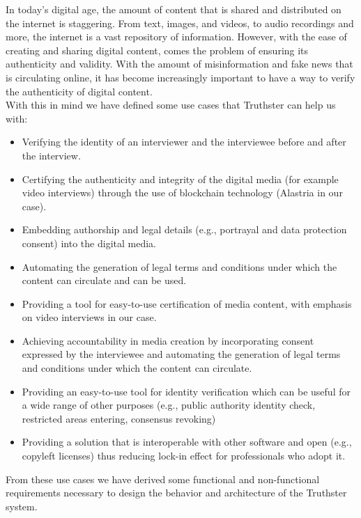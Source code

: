 \documentclass[target=mst,aauheader=]{thud}
\begin{document}
In today's digital age, the amount of content that is shared and distributed on the internet is staggering. From text, images, and videos, to audio recordings and more, the internet is a vast repository of information. However, with the ease of creating and sharing digital content, comes the problem of ensuring its authenticity and validity. With the amount of misinformation and fake news that is circulating online, it has become increasingly important to have a way to verify the authenticity of digital content.\\

With this in mind we have defined some use cases that Truthster can help us with:

\begin{itemize}

    \item Verifying the identity of an interviewer and the interviewee before and after the interview.
    \item Certifying the authenticity and integrity of the digital media (for example video interviews) through the use of blockchain technology (Alastria in our case).
    \item Embedding authorship and legal details (e.g., portrayal and data protection consent) into the digital media.
    \item Automating the generation of legal terms and conditions under which the content can circulate and can be used.
    \item Providing a tool for easy-to-use certification of media content, with emphasis on video interviews in our case.
    \item Achieving accountability in media creation by incorporating consent expressed by the interviewee and automating the generation of legal terms and conditions under which the content can circulate.
    \item Providing an easy-to-use tool for identity verification which can be useful for a wide range of other purposes (e.g., public authority identity check, restricted areas entering, consensus revoking)
    \item Providing a solution that is interoperable with other software and open (e.g., copyleft licenses) thus reducing lock-in effect for professionals who adopt it.
    
\end{itemize}

From these use cases we have derived some functional and non-functional requirements necessary to design the behavior and architecture of the Truthster system.\\
\end{document}
